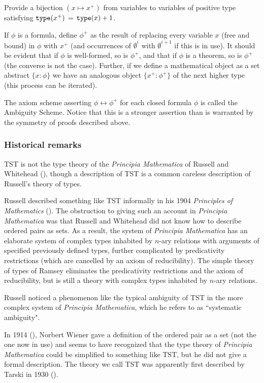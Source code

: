 \documentclass[112pt]{article}
\begin{document}
Provide a bijection $(x \mapsto x^+)$ from variables to variables of positive type satisfying   ${\tt type}(x^+)$ = ${\tt type}(x)+1$.

If $\phi$ is a formula, define $\phi^+$ as the result of replacing every variable $x$ (free and bound) in $\phi$ with $x^+$ (and occurrences of $\emptyset^i$ with $\emptyset^{i+1}$ if this is in use).   It should be evident that if $\phi$ is well-formed, so is $\phi^+$,
and that if $\phi$ is a theorem, so is $\phi^+$ (the converse is not the case).  Further, if we define a mathematical object as a set abstract $\{x:\phi\}$ we have an analogous
object $\{x^+:\phi^+\}$ of the next higher type (this process can be iterated).

The axiom scheme asserting $\phi \leftrightarrow \phi^+$ for each closed formula $\phi$ is called the Ambiguity Scheme.   Notice that this is a stronger assertion than is warranted by the symmetry of proofs described above.

\subsubsection{Historical remarks}

TST is not the type theory of the {\em Principia Mathematica\/} of Russell and Whitehead (\cite{pm}), though a description of TST is a common careless description of Russell's theory of types.

Russell described something like TST informally in his 1904 {\em Principles of Mathematics\/} (\cite{pm1}).  The obstruction to giving such an account in {\em Principia Mathematica\/} was that
Russell and Whitehead did not know how to describe ordered pairs as sets.  As a result, the system of {\em Principia Mathematica\/} has an elaborate system of  complex
types inhabited by $n$-ary relations with arguments of specified previously defined types, further complicated by predicativity restrictions (which are cancelled by an axiom of reducibility).
The simple theory of types of Ramsey eliminates the predicativity restrictions and the axiom of reducibility, but is still a theory with complex types inhabited by $n$-ary relations.

Russell noticed a phenomenon like the typical ambiguity of TST in the more complex system of {\em Principia Mathematica\/}, which he refers to as ``systematic ambiguity".

In 1914 (\cite{wiener}), Norbert Wiener gave a definition of the ordered pair as a set (not the one now in use) and seems to have recognized that the type theory of {\em Principia Mathematica\/} could be simplified to something like TST, but he did not give a formal description.  The theory we call TST was apparently first described by Tarski in 1930 (\cite{tarskiontst}).
\end{document}
